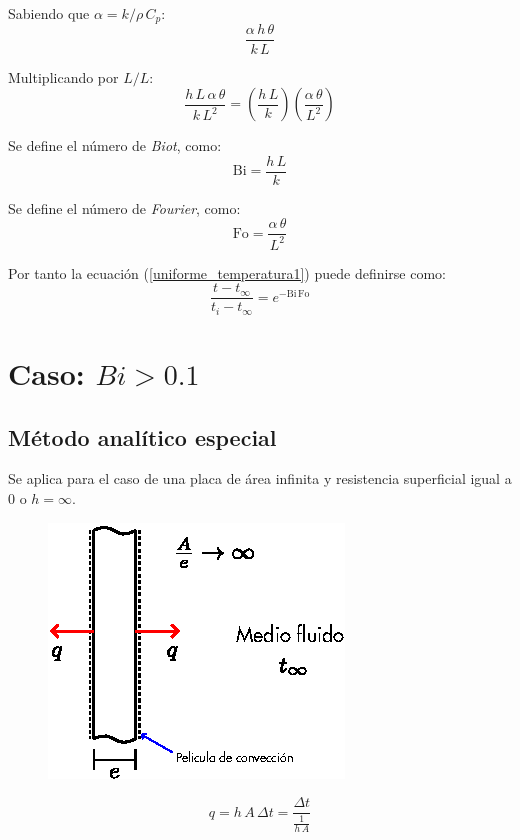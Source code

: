 Sabiendo que $\alpha=k/\rho\,C_p$:
\begin{equation*}
    \frac{\alpha\,h\,\theta}{k\,L}
\end{equation*}

Multiplicando por $L/L$:
\begin{equation*}
    \frac{h\,L\,\alpha\,\theta}{k\,L^2} =
    \left(\frac{h\,L}{k}\right)\left(\frac{\alpha\,\theta}{L^2}\right)
\end{equation*}

Se define el número de \emph{Biot}, como:
\begin{equation*}
    \text{Bi} = \frac{h\,L}{k}
\end{equation*}

Se define el número de \emph{Fourier}, como:
\begin{equation}
    \text{Fo} = \frac{\alpha\,\theta}{L^2}
\end{equation}

Por tanto la ecuación (\ref{uniforme_temperatura1}) puede definirse como:
\begin{equation}
    \frac{t-t_{\infty}}{t_i-t_{\infty}} = e^{-\text{Bi}\,\text{Fo}}
    \label{uniforme_temperatura2}
\end{equation}

\section{Caso: $Bi>0.1$}

\subsection{Método analítico especial}
Se aplica para el caso de una placa de área infinita y resistencia superficial
igual a $0$ o $h=\infty$.

\begin{figure}[!h]
\centering
\includegraphics[scale=1.75]{figura03_05.eps}
\end{figure}
\begin{equation*}
    q = h\,A\,\Delta t = \dfrac{\Delta t}{\frac{1}{h\,A}}
\end{equation*}

